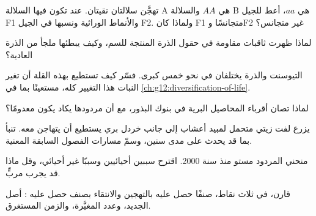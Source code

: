 \begin{exercise}[$\star\star$]\label{exo:g12:domesticated-plants:8}
تهجَّن سلالتان نقيتان. عند  تكون فيها السلالة A هي $AA$ والسلالة
B هي $aa$، أعط  للجيل F1 والأنماط الوراثية ونسبها في
الجيل F2. ولماذا كان F1 متجانسًا وF2 غير متجانس؟
\end{exercise}

\begin{exercise}[$\star\star$]\label{exo:g12:domesticated-plants:9}
لماذا ظهرت ثاقبات مقاومة في حقول الذرة المنتجة للسم، وكيف يبطئها ملجأ
من الذرة العادية؟
\end{exercise}

\begin{exercise}[$\star\star$]\label{exo:g12:domesticated-plants:10}
التيوسنت والذرة يختلفان في نحو خمس  كبرى. فسّر كيف تستطيع
 بهذه القلة أن تغير النبات هذا التغيير كله، مستعينًا بما في
\cref{ch:g12:diversification-of-life}.
\end{exercise}

\begin{exercise}[$\star\star$]\label{exo:g12:domesticated-plants:11}
لماذا تصان أقرباء المحاصيل البرية في بنوك البذور، مع أن مردودها يكاد
يكون معدومًا؟
\end{exercise}

\begin{exercise}[$\star\star\star$]\label{exo:g12:domesticated-plants:12}
يزرع لفت زيتي متحمل لمبيد أعشاب إلى جانب خردل بري يستطيع أن يتهاجن
معه. تنبأ بما قد يحدث على مدى سنين، وسمّ مسارات الفصول السابقة
المعنية.
\end{exercise}

\begin{exercise}[$\star\star\star$]\label{exo:g12:domesticated-plants:13}
منحني المردود مستو منذ سنة 2000. اقترح سببين أحيائيين وسببًا غير
أحيائي، وقل ماذا قد يجرب مربٍّ.
\end{exercise}

\begin{exercise}[$\star\star\star$]\label{exo:g12:domesticated-plants:14}
قارن، في ثلاث نقاط، صنفًا حصل عليه بالتهجين والانتقاء بصنف حصل عليه
: أصل  الجديد، وعدد  المغيَّرة، والزمن
المستغرق.
\end{exercise}

